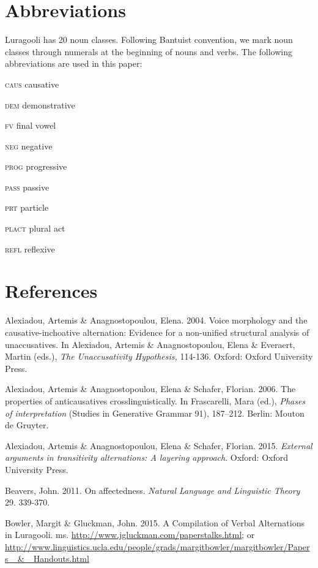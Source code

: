 \documentclass[output=paper]{langsci/langscibook}
\begin{document}
\begin{styleTabellenberschrift}
\begin{styleTabellenberschrift}
\chapter[Abbreviations]{Abbreviations}

Luragooli has 20 noun classes. Following Bantuist convention, we mark noun classes through numerals at the beginning of nouns and verbs. The following abbreviations are used in this paper: 

\textsc{caus}     causative 

\textsc{dem}     demonstrative 

\textsc{fv}     final vowel

\textsc{neg}     negative   

\textsc{prog}     progressive 

\textsc{pass}     passive 

\textsc{prt}     particle   

\textsc{plact   }plural act 

\textsc{refl}     reflexive

\chapter[References]{References}

Alexiadou, Artemis \& Anagnostopoulou, Elena. 2004. Voice morphology and the causative-inchoative alternation: Evidence for a non-unified structural analysis of unaccusatives. In Alexiadou, Artemis \& Anagnostopoulou, Elena \& Everaert, Martin (eds.), \textit{The Unaccusativity Hypothesis, }114-136. Oxford: Oxford University Press.

Alexiadou, Artemis \& Anagnostopoulou, Elena \& Schafer, Florian. 2006. The properties of anticausatives crosslinguistically. In Frascarelli, Mara (ed.), \textit{Phases of interpretation} (Studies in Generative Grammar 91), 187–212. Berlin: Mouton de Gruyter.

Alexiadou, Artemis \& Anagnostopoulou, Elena \& Schafer, Florian. 2015. \textit{External arguments in transitivity alternations: A layering approach}. Oxford: Oxford University Press.

Beavers, John. 2011. On affectedness. \textit{Natural Language and Linguistic Theory} 29. 339-370.

Bowler, Margit \& Gluckman, John. 2015. A Compilation of Verbal Alternations in Luragooli. ms. \url{http://www.jgluckman.com/paperstalks.html};  or \url{http://www.linguistics.ucla.edu/people/grads/margitbowler/margitbowler/Papers_ & _Handouts.html}


\end{styleTabellenberschrift}
\end{styleTabellenberschrift}
\end{document}

